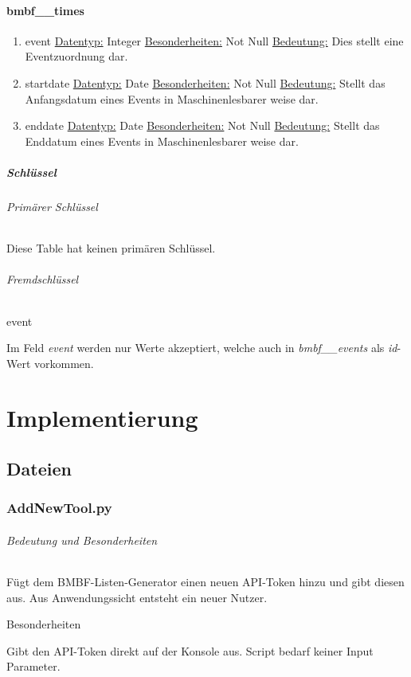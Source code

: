 \documentclass[12pt,parskip=full, pagea4]{scrreprt}
\begin{document}
			\subsection{bmbf\_\_times}
			\begin{enumerate}
				\item event
				\subitem \underline{Datentyp:} Integer
				\subitem \underline{Besonderheiten:} Not Null
				\subitem \underline{Bedeutung:} Dies stellt eine Eventzuordnung dar.
				\item startdate
				\subitem \underline{Datentyp:} Date
				\subitem \underline{Besonderheiten:} Not Null
				\subitem \underline{Bedeutung:} Stellt das Anfangsdatum eines Events in Maschinenlesbarer weise dar.
				\item enddate
				\subitem \underline{Datentyp:} Date
				\subitem \underline{Besonderheiten:} Not Null
				\subitem \underline{Bedeutung:} Stellt das Enddatum eines Events in Maschinenlesbarer weise dar.
			\end{enumerate}
			\leftskip=0cm
			\subsubsection{Schl\"ussel}
			\paragraph{Prim\"arer Schl\"ussel}Diese Table hat keinen prim\"aren Schl\"ussel.
			\paragraph{Fremdschl\"ussel} 
			\subparagraph{event} \leftskip=1.5cm Im Feld \textit{event} werden nur Werte akzeptiert, welche auch in \textit{bmbf\_\_events} als \textit{id}-Wert vorkommen.
\makeatletter
{}
\makeatother

	\leftskip=0cm
	\part{Implementierung}
		\chapter[Dateien]{Dateien}
			
			\hypertarget{ANT}{}
			\section{AddNewTool.py}
			\paragraph{Bedeutung und Besonderheiten}Fügt dem BMBF-Listen-Generator einen neuen API-Token hinzu und gibt diesen aus. Aus Anwendungssicht entsteht ein neuer Nutzer.
			\subparagraph{Besonderheiten}Gibt den API-Token direkt auf der Konsole aus. Script bedarf keiner Input Parameter.
\end{document}
